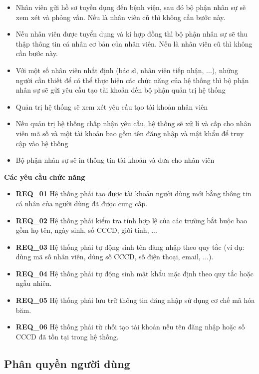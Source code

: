 \begin{itemize}
  \item Nhân viên gửi hồ sơ tuyền dụng đến bệnh viện, sau đó bộ phận nhân sự sẽ xem xét và phỏng vấn. Nếu là nhân viên cũ thì không cần bước này.
  \item Nếu nhân viên được tuyển dụng và kí hợp đồng thì bộ phận nhân sự sẽ thu thập thông tin cá nhân cơ bản của nhân viên. Nếu là nhân viên cũ thì không cần bước này.
  \item Với một số nhân viên nhất định (bác sĩ, nhân viên tiếp nhận, ...), những người cần thiết để có thể thực hiện các chức năng của hệ thống thì bộ phận nhân sự sẽ gửi yêu cầu tạo tài khoản đến bộ phận quản trị hệ thống
  \item Quản trị hệ thống sẽ xem xét yêu cầu tạo tài khoản nhân viên
  \item Nếu quản trị hệ thống chấp nhận yêu cầu, hệ thống sẽ xử lí và cấp cho nhân viên mã số và một tài khoản bao gồm tên đăng nhập và mật khẩu để truy cập vào hệ thống
  \item Bộ phận nhân sự sẽ in thông tin tài khoản và đưa cho nhân viên
\end{itemize}

\noindent \textbf{Các yêu cầu chức năng}

\begin{itemize}
  \item \textbf{REQ\_01} Hệ thống phải tạo được tài khoản người dùng mới bằng thông tin cá nhân của người dùng đã được cung cấp.
  \item \textbf{REQ\_02} Hệ thống phải kiểm tra tính hợp lệ của các trường bắt buộc bao gồm họ tên, ngày sinh, số CCCD, giới tính, ...
  \item \textbf{REQ\_03} Hệ thống phải tự động sinh tên đăng nhập theo quy tắc (ví dụ: dùng mã số nhân viên, dùng số CCCD, số điện thoại, email, ...).
  \item \textbf{REQ\_04} Hệ thống phải tự động sinh mật khẩu mặc định theo quy tắc hoặc ngẫu nhiên.
  \item \textbf{REQ\_05} Hệ thống phải lưu trữ thông tin đăng nhập sử dụng cơ chế mã hóa băm.
  \item \textbf{REQ\_06} Hệ thống phải từ chối tạo tài khoản nếu tên đăng nhập hoặc số CCCD đã tồn tại trong hệ thống.
\end{itemize}

\subsection{Phân quyền người dùng}

